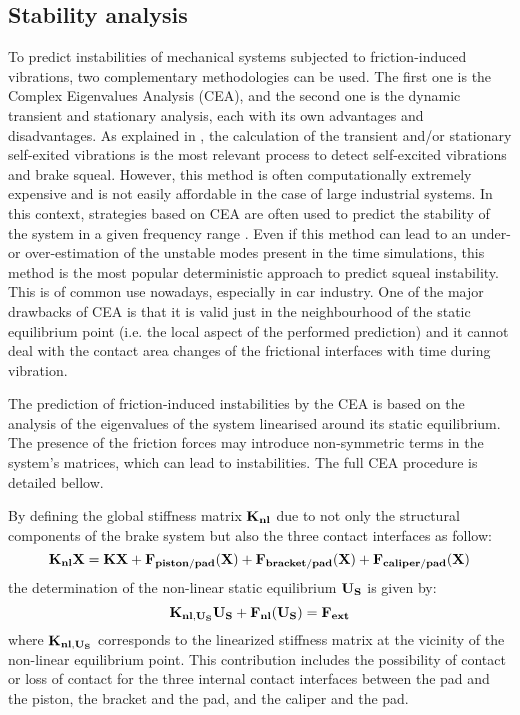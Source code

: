 \documentclass[final,1p]{elsarticle}
\begin{document}
\subsection{Stability analysis}

To predict instabilities of mechanical systems subjected to friction-induced vibrations, two complementary methodologies can be used. The first one is the Complex Eigenvalues Analysis (CEA), and the second one is the dynamic transient and stationary analysis, each with its own advantages and disadvantages. As explained in \cite{Sinou_MRC}, the calculation of the transient and/or stationary self-exited vibrations is the most relevant process to detect self-excited vibrations and brake squeal. However, this method is often computationally extremely expensive and is not easily affordable in the case of large industrial systems. In this context, strategies based on CEA are often used to predict the stability of the system in a given frequency range \cite{Kinkaid}.  Even if this method can lead to an under- or over-estimation of the unstable modes present in the  time simulations, this method is the most popular deterministic approach to predict squeal instability. This is of common use nowadays, especially in car industry. One of the major drawbacks of CEA is that it is valid just in the neighbourhood of the static equilibrium point (i.e. the local aspect of the performed prediction) and it cannot deal with the contact area changes of the frictional interfaces with time during vibration.

The prediction of friction-induced instabilities by the CEA is based on the analysis of the eigenvalues of the system linearised around its static equilibrium. The presence of the friction forces may introduce non-symmetric terms in the system's matrices, which can lead to instabilities. The full CEA procedure is detailed bellow.

By defining the global stiffness matrix $\bf{K_{nl}}$ due to not only the structural components of the brake system but also the three contact interfaces as follow: 
\begin{equation}
\bf{K_{nl}X}=\bf{KX} + \bf{F}_{piston/pad}(\bf{X}) + \bf{F}_{bracket/pad}(\bf{X})+ \bf{F}_{caliper/pad}(\bf{X}) 
\label{eq:jj1}
\end{equation}
the determination of the non-linear static equilibrium $\bf{U}_S$ is given by:
\begin{equation}
\bf{K_{nl,\bf{U}_S}}\bf{U_S} +\bf{ F}_{nl}(\bf{U}_S) = \bf{F}_{ext}
\label{eq:eq2}
\end{equation}
where $\bf{K_{nl,\bf{U}_S}}$ corresponds to the linearized stiffness matrix at the vicinity of the non-linear equilibrium point. This contribution includes the possibility of contact or loss of contact for the three internal contact interfaces between the pad and the piston, the bracket and the pad, and the caliper and the pad.
\end{document}
